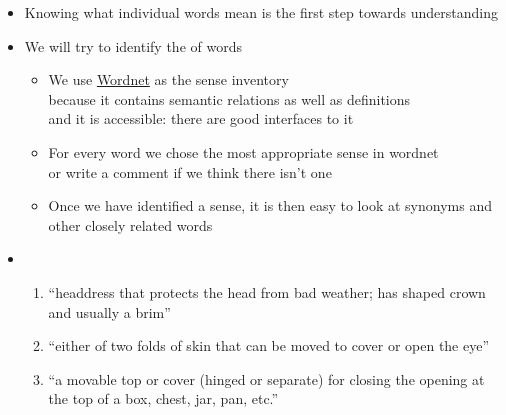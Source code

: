 \documentclass[a4paper,landscape,headrule,footrule,xetex]{foils}
\begin{document}
\begin{itemize}
\item Knowing what individual words mean is the first step towards understanding
\item We will try to identify the  of words
  \begin{itemize}
  \item We use \href{https://wordnet.princeton.edu/}{Wordnet} \citep{_Fellbaum:1998} as the sense inventory
    \\ because it contains semantic relations as well as definitions
    \\ and it is accessible: there are good interfaces to it
  \item For every word we chose the most appropriate sense in wordnet
    \\ or write a comment if we think there isn't one
  \item Once we have identified a sense, it is then easy to look at
    synonyms and other closely related words
  \end{itemize}
\item {}\task{}
  \begin{enumerate}\small
  \item {} ``headdress that protects the head
    from bad weather; has shaped crown and usually a brim''
  \item {} ``either of two folds of skin that
    can be moved to cover or open the eye''
  \item {} ``a movable top or cover (hinged or separate) for closing the opening at the top of a box, chest, jar, pan, etc.''

  \end{enumerate}


\end{itemize}
\end{document}
